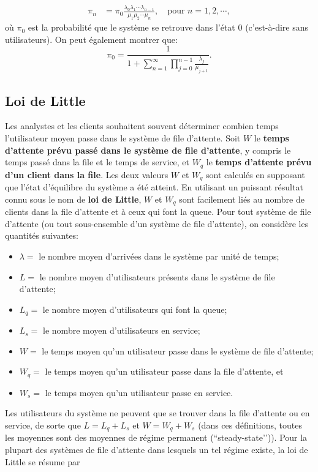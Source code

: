 \begin{align} \pi_{n} &= \pi_{0}\frac{\lambda_{0} \lambda_{1} \cdots \lambda_{n-1}}{\mu_{1} \mu_{2} \cdots \mu_{n}},\quad  \text{pour    } n=1,2,\cdots,\label{eq:ssbr}
\end{align}
où $\pi_{0}$ est la probabilité que le système se retrouve dans l'état 0 (c’est-à-dire sans utilisateurs). On peut également montrer \cite{QS_K1} que:
$$ \pi_{0} = \frac{1}{1+ \sum^{\infty}_{n=1} \prod^{n-1}_{j=0} \frac{\lambda_{j}}{\mu_{j+1}}}.$$ 

\subsection{Loi de Little}
Les analystes et les clients souhaitent souvent déterminer combien temps l'utilisateur moyen passe dans le système de file d'attente. Soit $W$ le \textbf{temps d'attente prévu passé dans le système de file d’attente}, y compris le temps passé dans la file et le temps de service, et $W_{q}$ le \textbf{temps d'attente prévu d'un client dans la file}. Les deux valeurs $W$ et $W_{q}$ sont calculés en supposant que l'état d'équilibre du système a été atteint. En utilisant un puissant résultat connu sous le nom de \textbf{loi de Little}, $W$ et $W_{q}$ sont facilement liés au nombre de clients dans la file d'attente et à ceux qui font la queue. \newl  Pour tout système de file d'attente (ou tout sous-ensemble d'un système de file d'attente), on considère les quantités suivantes:
\begin{itemize}[noitemsep]
\item $\lambda = $  le nombre moyen d'arrivées dans le système par unité de temps;  
\item $L =$  le nombre moyen d'utilisateurs présents dans le système de file d'attente;
\item $L_{q} = $  le nombre moyen d'utilisateurs qui font la queue;
\item $L_{s} = $  le nombre moyen d'utilisateurs en service;
\item $W = $  le temps moyen qu'un utilisateur passe dans le système de file d'attente;
\item $W_{q} = $  le temps moyen qu'un utilisateur passe dans la file d'attente, et
\item $W_{s} = $  le temps moyen qu'un utilisateur passe en service.
\end{itemize}
Les utilisateurs du système ne peuvent que se trouver dans la file d'attente ou en service, de sorte que $L = L_{q} + L_{s}$ et $W = W_{q} + W_{s}$ (dans ces définitions, toutes les moyennes sont des moyennes de régime permanent (``steady-state’’)). Pour la plupart des systèmes de file d'attente dans lesquels un tel régime existe, la loi de Little se résume par 
